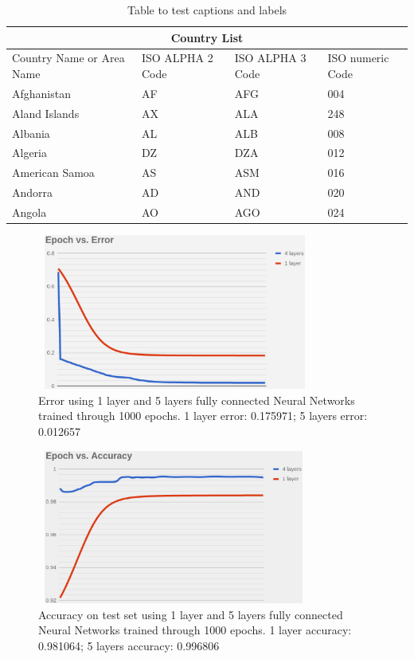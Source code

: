 \documentclass{llncs}       %
\begin{document}
\begin{table}[h!]
\begin{tabular}{ |p{3cm}||p{3cm}|p{3cm}|p{3cm}|  }
 \hline
 \multicolumn{4}{|c|}{Country List} \\
 \hline
 Country Name     or Area Name& ISO ALPHA 2 Code &ISO ALPHA 3 Code&ISO numeric Code\\
 \hline
 Afghanistan   & AF    &AFG&   004\\
 Aland Islands&   AX  & ALA   &248\\
 Albania &AL & ALB&  008\\
 Algeria    &DZ & DZA&  012\\
 American Samoa&   AS  & ASM&016\\
 Andorra& AD  & AND   &020\\
 Angola& AO  & AGO&024\\
 \hline
\end{tabular}
\caption{Table to test captions and labels}
\end{table}



\begin{figure}[h]
\centering
\includegraphics[width=9.08cm,height=5.11cm]{media/image10.eps}
\caption{ Error using 1 layer and 5 layers fully connected Neural Networks trained through 1000 epochs. 1 layer error:  0.175971;  5 layers error:  0.012657}
\end{figure}


\begin{figure}[h]
\centering
\includegraphics[width=9.00cm,height=5.07cm]{media/image11.eps}
\caption{Accuracy on test set using 1 layer and 5 layers fully 
connected Neural Networks trained through 1000 epochs. 1 layer accuracy: 
0.981064; 5 layers accuracy: 0.996806}
\end{figure}
\end{document}
